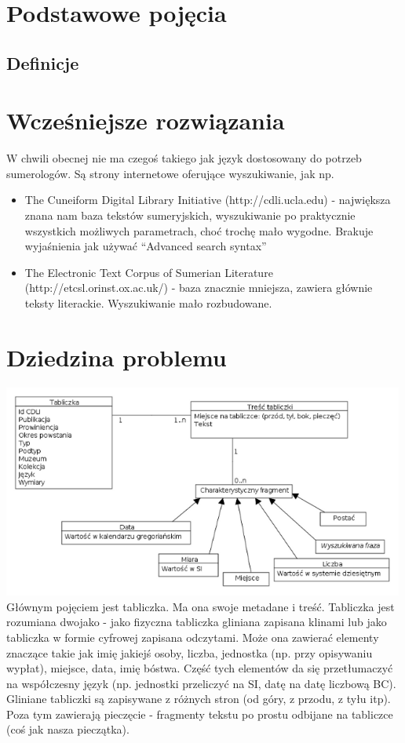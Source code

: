 \documentclass{pracamgr}
\begin{document}
\chapter{Podstawowe pojęcia}\label{r:pojecia}
\section{Definicje}
\chapter{Wcześniejsze rozwiązania}\label{r:losers}
W chwili obecnej nie ma czegoś takiego jak język dostosowany do potrzeb sumerologów. Są strony internetowe oferujące wyszukiwanie, 
jak np.
\begin{itemize}
\item The Cuneiform Digital Library Initiative (http://cdli.ucla.edu) - największa znana nam baza tekstów sumeryjskich, 
wyszukiwanie po praktycznie wszystkich możliwych parametrach, choć trochę mało wygodne. Brakuje wyjaśnienia jak 
używać ``Advanced search syntax''
\item The Electronic Text Corpus of Sumerian Literature (http://etcsl.orinst.ox.ac.uk/) - baza znacznie mniejsza, zawiera 
głównie teksty literackie. Wyszukiwanie mało rozbudowane.
\end{itemize}

\chapter{Dziedzina problemu}
\includegraphics[width=500px]{diagramy/Model-dziedziny.png}
Głównym pojęciem jest tabliczka. Ma ona swoje metadane i treść. Tabliczka jest rozumiana dwojako - jako fizyczna tabliczka gliniana
zapisana klinami lub jako tabliczka w formie cyfrowej zapisana odczytami. Może ona zawierać elementy znaczące takie jak imię jakiejś 
osoby, liczba, jednostka (np. przy opisywaniu wypłat), miejsce, data, imię bóstwa. Część tych elementów da się przetłumaczyć na 
współczesny język (np. jednostki przeliczyć na SI, datę na datę liczbową BC). Gliniane tabliczki są zapisywane z różnych stron 
(od góry, z przodu, z tyłu itp). Poza tym zawierają pieczęcie - fragmenty tekstu po prostu odbijane na tabliczce (coś jak nasza
pieczątka). 
\end{document}
